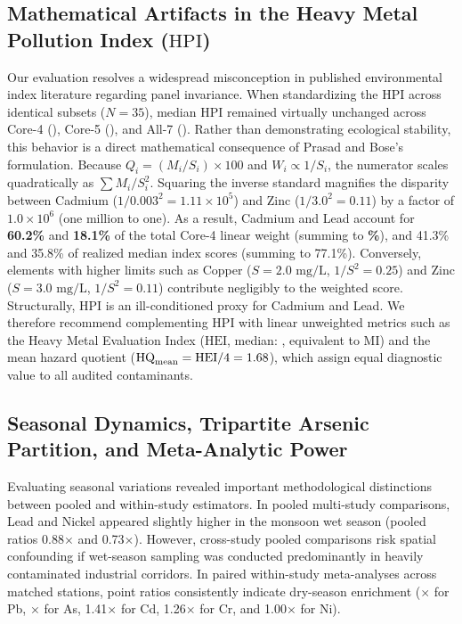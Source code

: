 \documentclass[authoryear,preprint,12pt]{elsarticle}
\begin{document}
\subsection{Mathematical Artifacts in the Heavy Metal Pollution Index (\texorpdfstring{$\mathrm{HPI}$}{HPI})}
Our evaluation resolves a widespread misconception in published environmental index literature regarding panel invariance. When standardizing the $\mathrm{HPI}$ across identical subsets ($N=35$), median $\mathrm{HPI}$ remained virtually unchanged across Core-4 (\HpiCommonSubsetCoreFourMedian), Core-5 (\HpiCommonSubsetCoreFiveMedian), and All-7 (\HpiCommonSubsetAllSevenMedian). Rather than demonstrating ecological stability, this behavior is a direct mathematical consequence of Prasad and Bose's \citeyearpar{Prasad2001} formulation. Because $Q_i = (M_i / S_i) \times 100$ and $W_i \propto 1/S_i$, the numerator scales quadratically as $\sum M_i / S_i^2$. Squaring the inverse standard magnifies the disparity between Cadmium ($1/0.003^2 = 1.11 \times 10^5$) and Zinc ($1/3.0^2 = 0.11$) by a factor of $1.0 \times 10^6$ (one million to one). As a result, Cadmium and Lead account for \textbf{60.2\%} and \textbf{18.1\%} of the total Core-4 linear weight (summing to \textbf{\HpiCdPbWeightSharePct\%}), and 41.3\% and 35.8\% of realized median index scores (summing to 77.1\%). Conversely, elements with higher limits such as Copper ($S=2.0\text{ mg/L}$, $1/S^2 = 0.25$) and Zinc ($S=3.0\text{ mg/L}$, $1/S^2 = 0.11$) contribute negligibly to the weighted score. Structurally, $\mathrm{HPI}$ is an ill-conditioned proxy for Cadmium and Lead. We therefore recommend complementing $\mathrm{HPI}$ with linear unweighted metrics such as the Heavy Metal Evaluation Index ($\mathrm{HEI}$, median: \HeiMedian, equivalent to $\mathrm{MI}$) and the mean hazard quotient ($\mathrm{HQ}_{\mathrm{mean}} = \mathrm{HEI}/4 = 1.68$), which assign equal diagnostic value to all audited contaminants.

\subsection{Seasonal Dynamics, Tripartite Arsenic Partition, and Meta-Analytic Power}
Evaluating seasonal variations revealed important methodological distinctions between pooled and within-study estimators. In pooled multi-study comparisons, Lead and Nickel appeared slightly higher in the monsoon wet season (pooled ratios 0.88$\times$ and 0.73$\times$). However, cross-study pooled comparisons risk spatial confounding if wet-season sampling was conducted predominantly in heavily contaminated industrial corridors. In paired within-study meta-analyses across matched stations, point ratios consistently indicate dry-season enrichment (\LeadWithinStudyRatio$\times$ for Pb, \ArsenicWithinStudyRatio$\times$ for As, 1.41$\times$ for Cd, 1.26$\times$ for Cr, and 1.00$\times$ for Ni).
\end{document}
